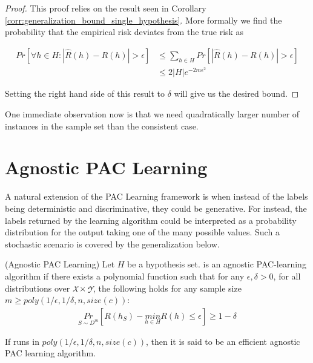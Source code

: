 \documentclass[../toml]{subfiles}
\begin{document}
\begin{proof}
This proof relies on the result seen in Corollary \ref{corr:generalization_bound_single_hypothesis}. More formally we find the
probability that the empirical risk deviates from the true risk as

\begin{align}
Pr\left[ \forall h \in H: |\hat{R}(h) - R(h)| > \epsilon \right] &\leq \sum_{h \in H} Pr\left[|\hat{R}(h) - R(h)| > \epsilon \right] \nonumber \\
&\leq 2|H|e^{-2m\epsilon^2}
\end{align}

Setting the right hand side of this result to $\delta$ will give us the desired bound.
\end{proof}

One immediate observation now is that we need quadratically larger number of
instances in the sample set than the consistent case.

\section{Agnostic PAC Learning}

A natural extension of the PAC Learning framework is when instead of the labels being
deterministic and discriminative, they could be generative. For instead, the labels
returned by the learning algorithm could be interpreted as a probability distribution
for the output taking one of the many possible values. Such a stochastic scenario is
covered by the generalization below.

\begin{definition}(Agnostic PAC Learning) \label{def:agnostic_pac}
Let $H$ be a hypothesis set.  is an agnostic PAC-learning algorithm if there
exists a polynomial function such that for any $\epsilon, \delta > 0$, for all distributions
 over $\cursive{X} \times \cursive{Y}$, the following holds for any sample
size $m \geq poly(1/\epsilon,1/\delta,n,size(c))$:
\begin{align}
\underset{S \sim D^m}{Pr} \left[ R(h_S) - \underset{h \in H}{min} R(h) \leq \epsilon  \right] \geq 1-\delta
\end{align}

If  runs in $poly(1/\epsilon,1/\delta,n,size(c))$, then it is said to be an efficient
agnostic PAC learning algorithm.
\end{definition}
\end{document}
